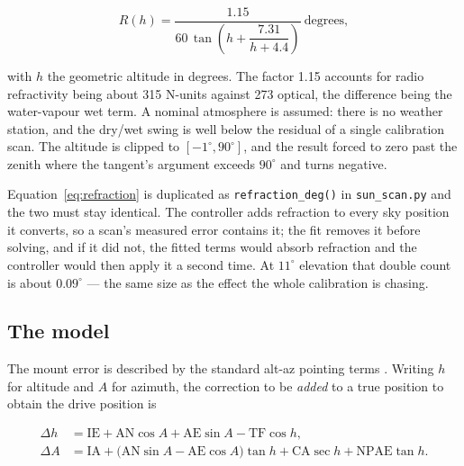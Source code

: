 \documentclass[11pt,a4paper]{article}
\begin{document}
\begin{equation}
R(h) = \frac{1.15}{60\,\tan\!\left(h + \dfrac{7.31}{h + 4.4}\right)} \ \text{degrees},
\label{eq:refraction}
\end{equation}

with $h$ the geometric altitude in degrees. The factor 1.15 accounts for radio refractivity being about 315 N-units against 273 optical, the difference being the water-vapour wet term. A nominal atmosphere is assumed: there is no weather station, and the dry/wet swing is well below the residual of a single calibration scan. The altitude is clipped to $[-1^\circ, 90^\circ]$, and the result forced to zero past the zenith where the tangent's argument exceeds $90^\circ$ and turns negative.

Equation~\eqref{eq:refraction} is duplicated as \texttt{refraction\_deg()} in \texttt{sun\_scan.py} and the two must stay identical. The controller adds refraction to every sky position it converts, so a scan's measured error contains it; the fit removes it before solving, and if it did not, the fitted terms would absorb refraction and the controller would then apply it a second time. At $11^\circ$ elevation that double count is about $0.09^\circ$ --- the same size as the effect the whole calibration is chasing.

\subsection{The model}

The mount error is described by the standard alt-az pointing terms \cite{wallace}. Writing $h$ for altitude and $A$ for azimuth, the correction to be \emph{added} to a true position to obtain the drive position is

\begin{align}
\Delta h &= \text{IE} + \text{AN}\cos A + \text{AE}\sin A - \text{TF}\cos h,
\label{eq:dalt}\\
\Delta A &= \text{IA} + \bigl(\text{AN}\sin A - \text{AE}\cos A\bigr)\tan h
            + \text{CA}\sec h + \text{NPAE}\tan h.
\label{eq:daz}
\end{align}
\end{document}
